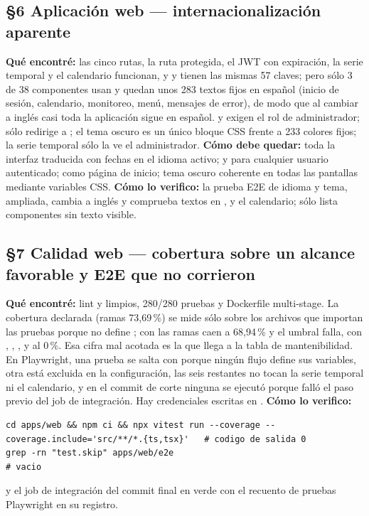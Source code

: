 \subsection*{\S6 Aplicaci\'on web --- internacionalizaci\'on aparente}
\textbf{Qu\'e encontr\'e:} las cinco rutas, la ruta protegida, el JWT con expiraci\'on, la serie temporal y el calendario funcionan, y  y  tienen las mismas 57 claves; pero s\'olo 3 de 38 componentes usan  y quedan unos 283 textos fijos en espa\~nol (inicio de sesi\'on, calendario, monitoreo, men\'u, mensajes de error), de modo que al cambiar a ingl\'es casi toda la aplicaci\'on sigue en espa\~nol.  y  exigen el rol de administrador; \rt{/} s\'olo redirige a ; el tema oscuro es un \'unico bloque CSS frente a 233 colores fijos; la serie temporal s\'olo la ve el administrador. \textbf{C\'omo debe quedar:} toda la interfaz traducida con fechas en el idioma activo;  y  para cualquier usuario autenticado; \rt{/} como p\'agina de inicio; tema oscuro coherente en todas las pantallas mediante variables CSS. \textbf{C\'omo lo verifico:} la prueba E2E de idioma y tema, ampliada, cambia a ingl\'es y comprueba textos en ,  y el calendario;  s\'olo lista componentes sin texto visible.

\subsection*{\S7 Calidad web --- cobertura sobre un alcance favorable y E2E que no corrieron}
\textbf{Qu\'e encontr\'e:} lint y  limpios, 280/280 pruebas y Dockerfile multi-stage. La cobertura declarada (ramas 73,69\,\%) se mide s\'olo sobre los archivos que importan las pruebas porque  no define ; con  las ramas caen a 68,94\,\% y el umbral falla, con , , ,  y  al 0\,\%. Esa cifra mal acotada es la que llega a la tabla de mantenibilidad. En Playwright, una prueba se salta con  porque ning\'un flujo define sus variables, otra est\'a excluida en la configuraci\'on, las seis restantes no tocan la serie temporal ni el calendario, y en el commit de corte ninguna se ejecut\'o porque fall\'o el paso previo del job de integraci\'on. Hay credenciales escritas en . \textbf{C\'omo lo verifico:}\begin{verbatim}
cd apps/web && npm ci && npx vitest run --coverage --coverage.include='src/**/*.{ts,tsx}'   # codigo de salida 0
grep -rn "test.skip" apps/web/e2e                                                          # vacio
\end{verbatim}
y el job de integraci\'on del commit final en verde con el recuento de pruebas Playwright en su registro.

